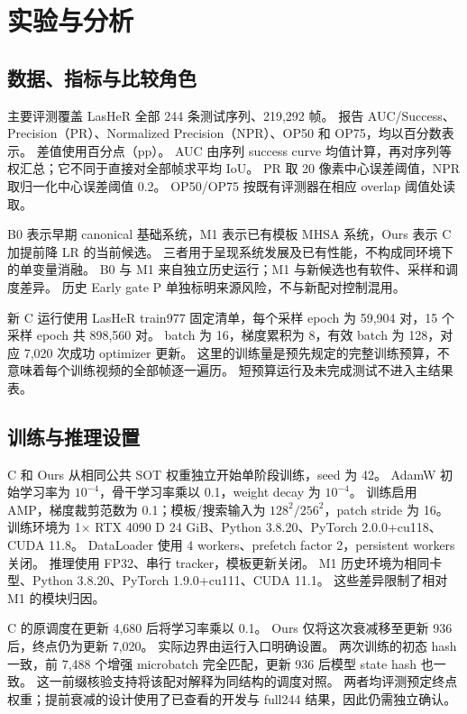 \documentclass[journal]{IEEEtran}
\begin{document}
\section{实验与分析}
\subsection{数据、指标与比较角色}
主要评测覆盖 LasHeR 全部 244 条测试序列、219,292 帧。
报告 AUC/Success、Precision（PR）、Normalized Precision（NPR）、OP50 和 OP75，均以百分数表示。
差值使用百分点（pp）。
AUC 由序列 success curve 均值计算，再对序列等权汇总；它不同于直接对全部帧求平均 IoU。
PR 取 20 像素中心误差阈值，NPR 取归一化中心误差阈值 0.2。
OP50/OP75 按既有评测器在相应 overlap 阈值处读取。

B0 表示早期 canonical 基础系统，M1 表示已有模板 MHSA 系统，Ours 表示 C 加提前降 LR 的当前候选。
三者用于呈现系统发展及已有性能，不构成同环境下的单变量消融。
B0 与 M1 来自独立历史运行；M1 与新候选也有软件、采样和调度差异。
历史 Early gate P 单独标明来源风险，不与新配对控制混用。

新 C 运行使用 LasHeR train977 固定清单，每个采样 epoch 为 59,904 对，15 个采样 epoch 共 898,560 对。
batch 为 16，梯度累积为 8，有效 batch 为 128，对应 7,020 次成功 optimizer 更新。
这里的训练量是预先规定的完整训练预算，不意味着每个训练视频的全部帧逐一遍历。
短预算运行及未完成测试不进入主结果表。

\subsection{训练与推理设置}
C 和 Ours 从相同公共 SOT 权重独立开始单阶段训练，seed 为 42。
AdamW 初始学习率为 $10^{-4}$，骨干学习率乘以 0.1，weight decay 为 $10^{-4}$。
训练启用 AMP，梯度裁剪范数为 0.1；模板/搜索输入为 $128^2/256^2$，patch stride 为 16。
训练环境为 1$\times$ RTX 4090 D 24 GiB、Python 3.8.20、PyTorch 2.0.0+cu118、CUDA 11.8。
DataLoader 使用 4 workers、prefetch factor 2，persistent workers 关闭。
推理使用 FP32、串行 tracker，模板更新关闭。
M1 历史环境为相同卡型、Python 3.8.20、PyTorch 1.9.0+cu111、CUDA 11.1。
这些差异限制了相对 M1 的模块归因。

C 的原调度在更新 4,680 后将学习率乘以 0.1。
Ours 仅将这次衰减移至更新 936 后，终点仍为更新 7,020。
实际边界由运行入口明确设置。
两次训练的初态 hash 一致，前 7,488 个增强 microbatch 完全匹配，更新 936 后模型 state hash 也一致。
这一前缀核验支持将该配对解释为同结构的调度对照。
两者均评测预定终点权重；提前衰减的设计使用了已查看的开发与 full244 结果，因此仍需独立确认。
\end{document}
